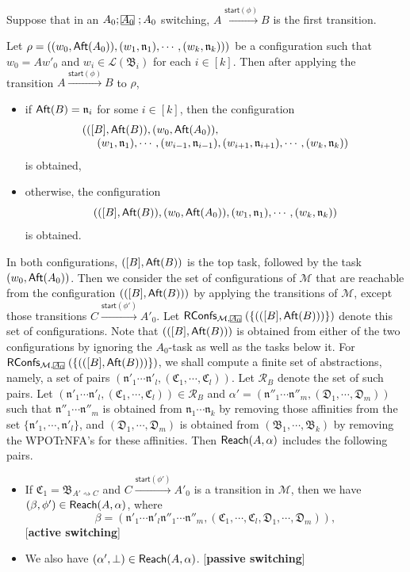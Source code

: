 \documentclass[preprint,12pt]{elsarticle}
\newcommand\rectangled[1]{\tikz[baseline=(torect.base)]{
    \node[shape = rectangle, draw, inner sep=0pt, outer sep = 0pt] (torect) {#1}
    }
}
\newcommand{\mrectangled}[1]{\text{\rectangled{\ensuremath{#1}}}}
\newcommand{\mhcancel}[1]{\mrectangled{#1}}
\newcommand\Mm{{\mathcal{M} }}
\newcommand\aft{{\sf Aft}}
\newcommand\startactivity{{\mathsf{start} }}
\newcommand\aname{\mathfrak{n}}
\newcommand\AutReach{\mathscr{R}}
\newcommand\RConfs{\mathsf{RConfs}}
\newcommand\reach{{\sf Reach}}
\newcommand\AutB{{\mathfrak{B} }}
\newcommand\AutC{{\mathfrak{C} }}
\newcommand\AutD{{\mathfrak{D} }}
\newcommand\Lang{{\mathscr{L} }}
\newcommand{\WOTrNFA}{\textsf{WPOTrNFA}}
\begin{document}
Suppose that in an $A_0;\mhcancel{A_0};A_0$ switching, $A \xrightarrow{\startactivity(\phi)} B$ is the first transition. 

Let $\rho = ((w_0, \aft(A_0)), (w_1, \aname_1), \cdots, (w_k, \aname_k)))$ be a configuration such that $w_0 = A w'_0$ and $w_i \in \Lang(\AutB_i)$ for each $i \in [k]$.
Then after applying the transition $A \xrightarrow{\startactivity(\phi)} B$ to $\rho$, 
\begin{itemize}
\item if $\aft(B) = \aname_i$ for some $i \in [k]$, then the configuration 
%
$$
\begin{array}{l}
(([B], \aft(B)), (w_0, \aft(A_0)),  \\
\ \ \ \ (w_1, \aname_1), \cdots, (w_{i-1}, \aname_{i-1}), (w_{i+1}, \aname_{i+1}), \cdots, (w_{k}, \aname_{k}))
\end{array}
$$ 
%
is obtained, 
%
\item otherwise, the configuration 
%
$$(([B], \aft(B)), (w_0, \aft(A_0)), (w_1, \aname_1), \cdots, (w_k, \aname_k))$$ 
%
is obtained. 
\end{itemize}
In both configurations, $([B], \aft(B))$ is the top task, followed by the task $(w_0, \aft(A_0))$. 
%
Then we consider the set of configurations of $\Mm$ that are reachable from the configuration $(([B], \aft(B)))$ by applying the transitions of $\Mm$, except those transitions $C \xrightarrow{\startactivity(\phi')} A'_0$. Let $\RConfs_{\Mm, \mhcancel{A_0}}(\{(([B], \aft(B)))\})$ denote this set of configurations. 
Note that $(([B], \aft(B)))$ is obtained from either of the two configurations by ignoring the $A_0$-task as well as the tasks below it. 
%
For $\RConfs_{\Mm, \mhcancel{A_0}}(\{(([B], \aft(B)))\})$, we shall compute a finite set of abstractions, namely, a set of pairs $(\aname'_1 \cdots \aname'_l, (\AutC_1, \cdots, \AutC_l))$.
Let $\AutReach_B$ denote the set of such pairs. 
Let $(\aname'_1 \cdots \aname'_l, (\AutC_1, \cdots, \AutC_l)) \in \AutReach_B$ and $\alpha' = (\aname''_1 \cdots \aname''_m, (\AutD_1, \cdots, \AutD_m))$ such that $\aname''_1 \cdots \aname''_m$ is obtained from $\aname_1 \cdots \aname_k$ by removing those affinities from the set $\{\aname'_1, \cdots, \aname'_l\}$, and 
$(\AutD_1, \cdots, \AutD_m)$ is obtained from $(\AutB_1, \cdots, \AutB_k)$ by removing the {\WOTrNFA}'s for these affinities.  
Then $\reach(A, \alpha)$ includes the following pairs. 
\begin{itemize}
\item If $\AutC_1 = \AutB_{A' \rightsquigarrow C}$ and 
$C \xrightarrow{\startactivity(\phi')} A'_0$ is a transition in $\Mm$, then we have $(\beta, \phi') \in \reach(A, \alpha)$, where  
$$\beta = (\aname'_1 \cdots \aname'_l \aname''_1 \cdots \aname''_m, (\AutC_1, \cdots, \AutC_l, \AutD_1, \cdots, \AutD_m)),$$
[{\bf active switching}]
%
\item We also have $(\alpha', \bot) \in \reach(A, \alpha)$. [{\bf passive switching}]
\end{itemize}
\end{document}
